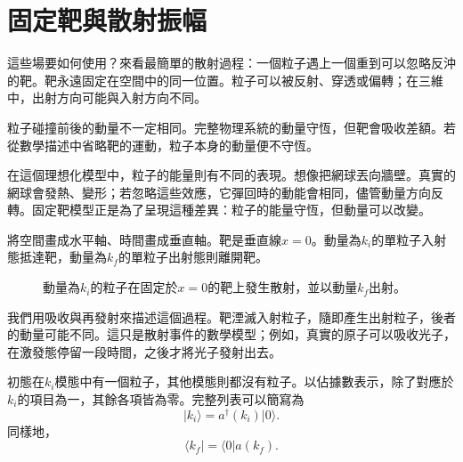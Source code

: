 
\section{固定靶與散射振幅}

這些場要如何使用？來看最簡單的散射過程：一個粒子遇上一個重到可以忽略反沖的靶。靶永遠固定在空間中的同一位置。粒子可以被反射、穿透或偏轉；在三維中，出射方向可能與入射方向不同。

粒子碰撞前後的動量不一定相同。完整物理系統的動量守恆，但靶會吸收差額。若從數學描述中省略靶的運動，粒子本身的動量便不守恆。

在這個理想化模型中，粒子的能量則有不同的表現。想像把網球丟向牆壁。真實的網球會發熱、變形；若忽略這些效應，它彈回時的動能會相同，儘管動量方向反轉。固定靶模型正是為了呈現這種差異：粒子的能量守恆，但動量可以改變。

將空間畫成水平軸、時間畫成垂直軸。靶是垂直線\(x=0\)。動量為\(k_i\)的單粒子入射態抵達靶，動量為\(k_f\)的單粒子出射態則離開靶。

\begin{figure}[h]
\centering
{}
\caption{動量為\(k_i\)的粒子在固定於\(x=0\)的靶上發生散射，並以動量\(k_f\)出射。}
\end{figure}

我們用吸收與再發射來描述這個過程。靶湮滅入射粒子，隨即產生出射粒子，後者的動量可能不同。這只是散射事件的數學模型；例如，真實的原子可以吸收光子，在激發態停留一段時間，之後才將光子發射出去。

\begin{classroomqa}
\end{classroomqa}

初態在\(k_i\)模態中有一個粒子，其他模態則都沒有粒子。以佔據數表示，除了對應於\(k_i\)的項目為一，其餘各項皆為零。完整列表可以簡寫為
\begin{equation}
\lvert k_i\rangle=a^\dagger(k_i)\lvert0\rangle.
\end{equation}
同樣地，
\begin{equation}
\langle k_f\rvert=\langle0\rvert a(k_f).
\end{equation}

